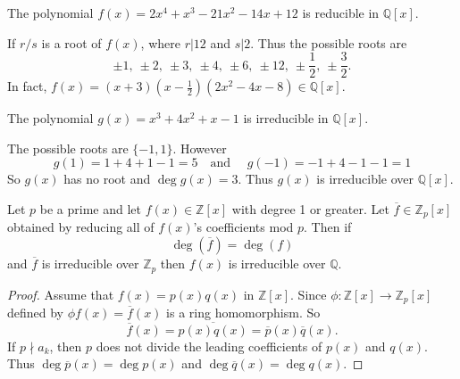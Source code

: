 \begin{example}
    The polynomial $f(x) = 2x^4 + x^3 - 21x^2 - 14x + 12$ is reducible in $\mathbb{Q}[x]$.
\end{example}
\begin{solution}
    If $r/s$ is a root of $f(x)$, where $r|12$ and $s|2$. Thus the possible roots are 
    \[
        \pm 1,\> \pm 2,\> \pm 3,\> \pm 4,\> \pm 6,\> \pm 12,\> \pm \frac{1}{2},\> \pm \frac{3}{2}.
    \]
    In fact, $f(x) = (x+3) \left(x - \frac{1}{2} \right)(2x^2 - 4x - 8) \in \mathbb{Q}[x]$.
\end{solution}

\begin{example}
    The polynomial $g(x) = x^3 + 4x^2 + x - 1$ is irreducible in $\mathbb{Q}[x]$.
\end{example}
\begin{solution}
    The possible roots are $\{-1, 1\}$. However
    \[
        g(1) = 1 + 4 + 1 - 1 = 5 \quad \text{and }\quad g(-1) = -1 + 4 - 1 - 1 = 1
    \]
    So $g(x)$ has no root and $\deg g(x) = 3$. Thus $g(x)$ is irreducible over $\mathbb{Q}[x]$.
\end{solution}

\begin{theorem}
    Let $p$ be a prime and let $f(x) \in \mathbb{Z}[x]$ with degree 1 or greater. Let 
    $\overline{f} \in \mathbb{Z}_p[x]$ obtained by reducing all of $f(x)$'s coefficients 
    mod $p$. Then if 
    \begin{equation}
        \deg(\overline{f}) = \deg(f)
    \end{equation}
    and $\overline{f}$ is irreducible over $\mathbb{Z}_p$ then $f(x)$ is irreducible over 
    $\mathbb{Q}$.
\end{theorem}
\begin{proof}
    Assume that $f(x) = p(x) q(x)$ in $\mathbb{Z}[x]$. Since $\phi: \mathbb{Z}[x] \to \mathbb{Z}_p[x]$
    defined by $\phi f(x) = \overline{f}(x)$ is a ring homomorphism. So 
    \[
        \overline{f}(x) = \overline{p(x) q(x)} = \overline{p}(x) \overline{q}(x).
    \]
    If $p \nmid a_k$, then $p$ does not divide the leading coefficients of $p(x)$ and $q(x)$. Thus 
    $\deg \overline{p}(x) = \deg p(x)$ and $\deg \overline{q}(x) = \deg q(x)$.
\end{proof}

